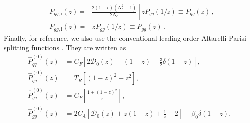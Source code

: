 \documentclass[a4paper, 12pt]{book}
\begin{document}
\begin{appendices}
\begin{equation}
\begin{split}
    & P_{gq, \mathrm{i}} (z) = \left[\frac{2(1-\epsilon)(N_c^2-1)}{2N_c}\right]z P_{gq}(1/z) \equiv P_{qg}(z) \, , \\
    & P_{gg, \mathrm{i}} (z) = -zP_{gg}(1/z) \equiv P_{gg}(z) \, .
  \end{split}
\end{equation}
Finally, for reference, we also use the conventional leading-order Altarelli-Parisi splitting functions \cite{ellis}. They are written as 
\begin{equation}
\begin{aligned}
    \hat{P}_{qq}^{(0)}(z) &= C_F \left[ 2 \mathcal{D}_0(z) - (1+z) + \frac{3}{2} \delta(1-z) \right], \\
    \hat{P}_{qg}^{(0)}(z) &= T_R \left[ (1-z)^2 + z^2 \right], \\
    \hat{P}_{gq}^{(0)}(z) &= C_F \left[ \frac{1+(1-z)^2}{z} \right], \\
    \hat{P}_{gg}^{(0)}(z) &= 2C_A \left[ \mathcal{D}_0(z) + z(1-z) + \frac{1}{z} - 2 \right] + \beta_0\delta(1-z).
\end{aligned}
\label{altarelli-parisi}
\end{equation}

\clearpage
\end{appendices}

\pagestyle{biblio}
\printbibliography[heading = bibintoc, title = {Bibliography}]
\end{document}
